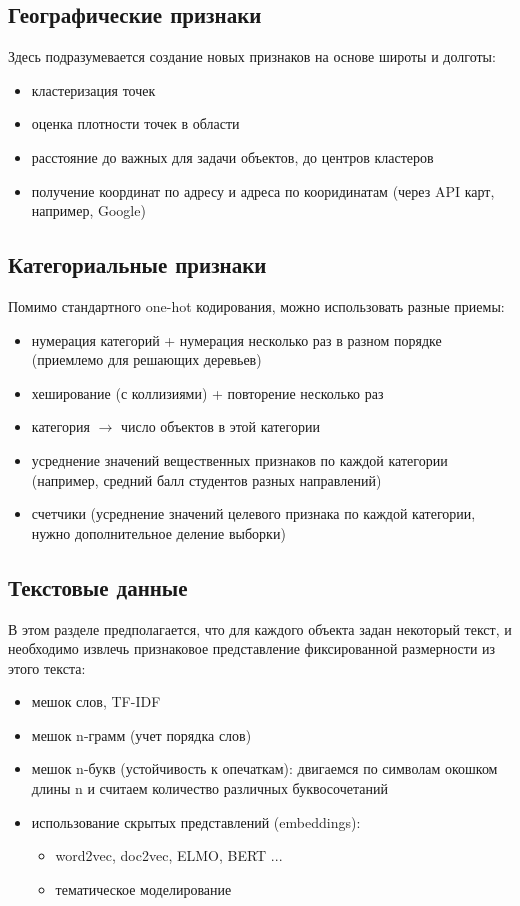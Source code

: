\documentclass[12pt,a4paper]{article}
\begin{document}
    \subsection{Географические признаки}
    Здесь подразумевается создание новых признаков на основе широты и долготы:
     \begin{itemize}
    	\item кластеризация точек
    	\item оценка плотности точек в области
    	\item расстояние до важных для задачи объектов, до центров кластеров
    	\item получение координат по адресу и адреса по кооридинатам (через API карт, например, Google)
    \end{itemize}

	\subsection{Категориальные признаки}
	Помимо стандартного one-hot кодирования, можно использовать разные приемы:
	\begin{itemize}
		\item нумерация категорий + нумерация несколько раз в разном порядке (приемлемо для решающих деревьев)
		\item хеширование (с коллизиями) + повторение несколько раз
		\item категория $\rightarrow$ число объектов в этой категории
		\item усреднение значений вещественных признаков по каждой категории (например, средний балл студентов разных направлений)
		\item счетчики (усреднение значений целевого признака по каждой категории, нужно дополнительное деление выборки)
	\end{itemize}

	\subsection{Текстовые данные}
	В этом разделе предполагается, что для каждого объекта задан некоторый текст, и необходимо извлечь признаковое представление фиксированной размерности из этого текста:
	\begin{itemize}
		\item мешок слов, TF-IDF
		\item мешок n-грамм (учет порядка слов)
		\item мешок n-букв (устойчивость к опечаткам): двигаемся по символам окошком длины n и считаем количество различных буквосочетаний
		\item использование скрытых представлений (embeddings):
		\begin{itemize}
			\item word2vec, doc2vec, ELMO, BERT ... 
			\item тематическое моделирование
		\end{itemize}
	\end{itemize}
\end{document}
